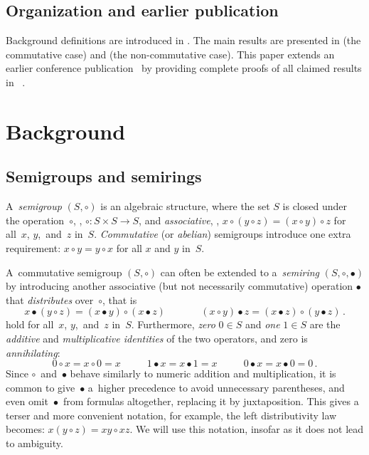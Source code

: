 %

\subsection{Organization and earlier publication}

Background definitions are introduced in . The main
results are presented in  (the commutative case)
and  (the non-commutative case).
This paper extends an earlier conference publication~\cite{conf-version}
by providing complete proofs of all claimed results in
~.

\section{Background} \label{sec:background}

\subsection{Semigroups and semirings}
%
A~\emph{semigroup} $(S, \circ)$ is an algebraic structure, where
%
the set $S$ is closed under the operation~$\circ$,
\ie, $\circ : S\times S \rightarrow S$,
and
\emph{associative}, \ie,
$x \circ (y \circ z) = (x \circ y) \circ z$ for all~$x$, $y$,~and~$z$
in~$S$.
\emph{Commutative} (or \emph{abelian}) semigroups introduce
one extra requirement: $x \circ y = y \circ x$ for all $x$ and $y$
in~$S$.

A~commutative semigroup $(S, \circ)$ can often be extended to
a~\emph{semiring} $(S, \circ, \bullet)$ by introducing
another associative (but not necessarily commutative)
operation $\bullet$ that \emph{distributes} over~$\circ$, that is
\[
x \bullet (y \circ z) = (x \bullet y) \circ (x \bullet z)~~~~~~~~~~~~~~~~(x \circ y) \bullet z = (x \bullet z) \circ (y \bullet z)\,.
\]
hold for all~$x$, $y$,~and~$z$ in~$S$.
Furthermore, \emph{zero} $0 \in S$ and \emph{one} $1 \in S$ are the
\emph{additive} and \emph{multiplicative identities} of the two operators,
and zero is \emph{annihilating}:
\[
0 \circ x = x \circ 0=x~~~~~~~~~~~~1 \bullet x = x \bullet 1 = x~~~~~~~~~~~~0 \bullet x = x \bullet 0 = 0\,.
\]
Since $\circ$~and~$\bullet$ behave
similarly to numeric addition and multiplication, it is common to
give~$\bullet$ a~higher precedence to avoid
unnecessary parentheses, and even omit~$\bullet$~from
formulas altogether, replacing it by juxtaposition.
This gives a terser and more convenient notation, for example, the left
distributivity law becomes: $x (y \circ z) = x y \circ x z$. We will use this
notation, insofar as it does not lead to ambiguity.

